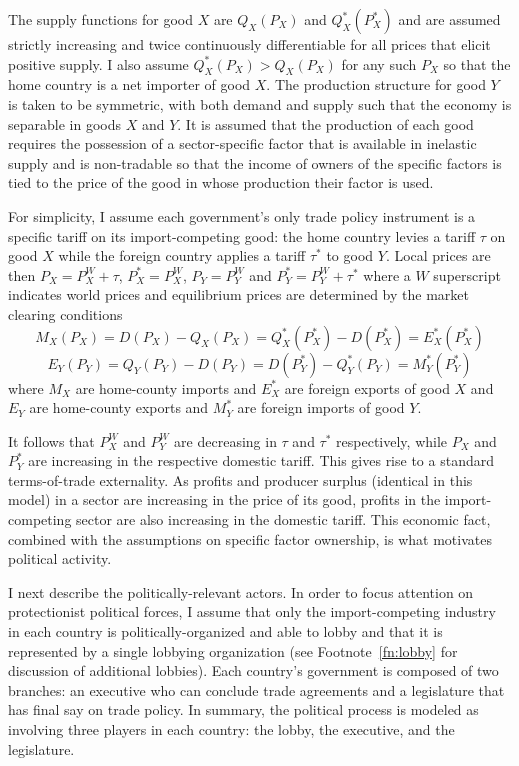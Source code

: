 \documentclass[10pt]{article}
\begin{document}
The supply functions for good $X$ are $Q_X(P_X)$ and $Q_X^*(P_X^*)$ and are assumed strictly increasing and twice continuously differentiable for all prices that elicit positive supply. I also assume $Q_X^*(P_X) > Q_X(P_X)$ for any such $P_X$ so that the home country is a net importer of good $X$. The production structure for good $Y$ is taken to be symmetric, with both demand and supply such that the economy is separable in goods $X$ and $Y$. It is assumed that the production of each good requires the possession of a sector-specific factor that is available in inelastic supply and is non-tradable so that the income of owners of the specific factors is tied to the price of the good in whose production their factor is used.

For simplicity, I assume each government's only trade policy instrument is a specific tariff on its import-competing good: the home country levies a tariff $\tau$ on good $X$ while the foreign country applies a tariff $\tau^*$ to good $Y$. Local prices are then $P_X = P_X^W + \tau$, $P_X^* = P_X^W$, $P_Y = P_Y^W$ and $P_Y^* = P_Y^W + \tau^*$ where a $W$ superscript indicates world prices and equilibrium prices are determined by the market clearing conditions
$$M_X(P_X)= D(P_X)-Q_X(P_X) = Q_X^*(P_X^*) - D(P_X^*) = E_X^*(P_X^*)$$
$$E_Y(P_Y)=Q_Y(P_Y)-D(P_Y) = D(P_Y^*)-Q_Y^*(P_Y) = M_Y^*(P_Y^*)$$
where $M_X$ are home-county imports and $E_X^*$ are foreign exports of good $X$ and $E_Y$ are home-county exports and $M_Y^*$ are foreign imports of good $Y$.

It follows that $P_X^W$ and $P_Y^W$ are decreasing in $\tau$ and $\tau^*$ respectively, while $P_X$ and $P_Y^*$ are increasing in the respective domestic tariff. This gives rise to a standard terms-of-trade externality. As profits and producer surplus (identical in this model) in a sector are increasing in the price of its good, profits in the import-competing sector are also increasing in the domestic tariff. This economic fact, combined with the assumptions on specific factor ownership, is what motivates political activity.

I next describe the politically-relevant actors. In order to focus attention on protectionist political forces, I assume that only the import-competing industry in each country is politically-organized and able to lobby and that it is represented by a single lobbying organization (see Footnote~\ref{fn:lobby} for discussion of additional lobbies). Each country's government is composed of two branches: an executive who can conclude trade agreements and a legislature that has final say on trade policy. In summary, the political process is modeled as involving three players in each country: the lobby, the executive, and the legislature.
\end{document}
